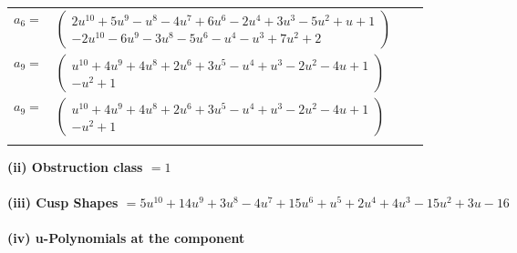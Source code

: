 \documentclass[1p]{elsarticle_modified}
\theoremstyle{definition}
\begin{document}
\begin{tabular}{m{7pt} m{180pt} m{7pt} m{180pt} }
\flushright $a_{6}=$&$\begin{pmatrix}2 u^{10}+5 u^9- u^8-4 u^7+6 u^6-2 u^4+3 u^3-5 u^2+u+1\\-2 u^{10}-6 u^9-3 u^8-5 u^6- u^4- u^3+7 u^2+2\end{pmatrix}$ \\
\flushright $a_{9}=$&$\begin{pmatrix}u^{10}+4 u^9+4 u^8+2 u^6+3 u^5- u^4+u^3-2 u^2-4 u+1\\- u^2+1\end{pmatrix}$\\ \flushright $a_{9}=$&$\begin{pmatrix}u^{10}+4 u^9+4 u^8+2 u^6+3 u^5- u^4+u^3-2 u^2-4 u+1\\- u^2+1\end{pmatrix}$\\&\end{tabular}
\flushleft \textbf{(ii) Obstruction class $= 1$}\\~\\
\flushleft \textbf{(iii) Cusp Shapes $= 5 u^{10}+14 u^9+3 u^8-4 u^7+15 u^6+u^5+2 u^4+4 u^3-15 u^2+3 u-16$}\\~\\
\newpage\renewcommand{\arraystretch}{1}
\flushleft \textbf{(iv) u-Polynomials at the component}\newline \\
\end{document}
